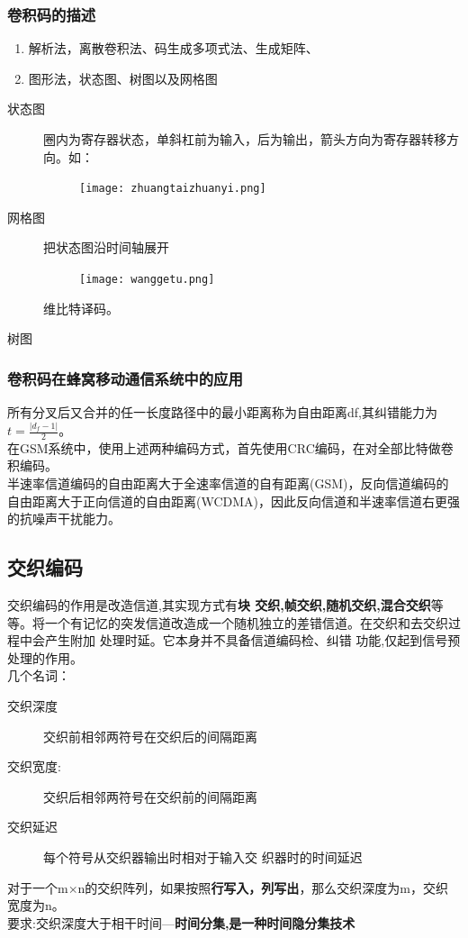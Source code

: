 \subsubsection{卷积码的描述}
\begin{enumerate}
	\item 解析法，离散卷积法、码生成多项式法、生成矩阵、
	\item 图形法，状态图、树图以及网格图
\end{enumerate}
\begin{description}
	\item[状态图] 圈内为寄存器状态，单斜杠前为输入，后为输出，箭头方向为寄存器转移方向。如：
	\begin{figure}[H]
		\centering
		\texttt{[image: zhuangtaizhuanyi.png]}
		\caption{}
		\label{fig:}
	\end{figure}
	\item[网格图] 把状态图沿时间轴展开
	\begin{figure}[H]
		\centering
		\texttt{[image: wanggetu.png]}
		\caption{}
		\label{fig:}
	\end{figure}
	维比特译码。
	\item [树图]
\end{description}
\subsubsection{卷积码在蜂窝移动通信系统中的应用}
所有分叉后又合并的任一长度路径中的最小距离称为自由距离df,其纠错能力为$ t = \frac{|d_f -1 |}{2} $。\\
在GSM系统中，使用上述两种编码方式，首先使用CRC编码，在对全部比特做卷积编码。\\
半速率信道编码的自由距离大于全速率信道的自有距离(GSM)，反向信道编码的自由距离大于正向信道的自由距离(WCDMA)，因此反向信道和半速率信道右更强的抗噪声干扰能力。
\subsection{交织编码}
交织编码的作用是改造信道,其实现方式有\textbf{块
交织,帧交织,随机交织,混合交织}等等。将一个有记忆的突发信道改造成一个随机独立的差错信道。在交织和去交织过程中会产生附加
处理时延。它本身并不具备信道编码检、纠错
功能,仅起到信号预处理的作用。\\
几个名词：
\begin{description}
	\item[交织深度
	] 交织前相邻两符号在交织后的间隔距离
	\item[交织宽度:
	] 交织后相邻两符号在交织前的间隔距离
	\item [交织延迟
	]每个符号从交织器输出时相对于输入交
	织器时的时间延迟
	
\end{description}
对于一个m$\times$n的交织阵列，如果按照\textbf{行写入，列写出}，那么交织深度为m，交织宽度为n。\\
要求:交织深度大于相干时间---\textbf{时间分集,是一种时间隐分集技术}
